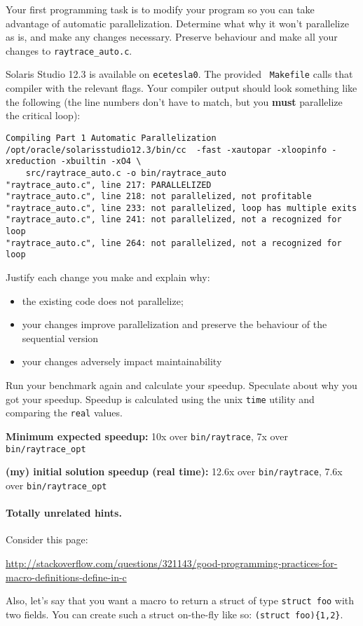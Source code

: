 \documentclass[letterpaper,10pt]{article}
\begin{document}
Your first programming task is to modify your program so you can take
advantage of automatic parallelization. Determine what why it won't
parallelize as is, and make any changes necessary. Preserve behaviour
and make all your changes to {\tt raytrace\_auto.c}.

Solaris Studio 12.3 is available on {\tt ecetesla0}. The provided {\tt
  Makefile} calls that compiler with the relevant flags. Your compiler
output should look something like the following (the line numbers
don't have to match, but you {\bf must} parallelize the critical loop):

\newpage
\begin{lstlisting}
Compiling Part 1 Automatic Parallelization
/opt/oracle/solarisstudio12.3/bin/cc  -fast -xautopar -xloopinfo -xreduction -xbuiltin -xO4 \
    src/raytrace_auto.c -o bin/raytrace_auto
"raytrace_auto.c", line 217: PARALLELIZED
"raytrace_auto.c", line 218: not parallelized, not profitable
"raytrace_auto.c", line 233: not parallelized, loop has multiple exits
"raytrace_auto.c", line 241: not parallelized, not a recognized for loop
"raytrace_auto.c", line 264: not parallelized, not a recognized for loop
\end{lstlisting}

Justify each change you make and explain why:
\begin{itemize}
\item the existing code does not parallelize;
\item your changes improve parallelization and preserve the behaviour of the sequential version
\item your changes adversely impact maintainability
\end{itemize}

Run your benchmark again and calculate your speedup. Speculate about why you got your speedup. Speedup is calculated using the unix \texttt{time} utility and comparing the \texttt{real} values. 

\squishlist
  \item {\bf Minimum expected speedup:} 10x over \texttt{bin/raytrace}, 7x over \texttt{bin/raytrace\_opt}
  \item {\bf (my) initial solution speedup (real time):} 12.6x over \texttt{bin/raytrace}, 7.6x over \texttt{bin/raytrace\_opt}
\squishend

\paragraph{Totally unrelated hints.} Consider this page:
\begin{center}
  \scriptsize \url{http://stackoverflow.com/questions/321143/good-programming-practices-for-macro-definitions-define-in-c}
\end{center}
Also, let's say that you want a macro to return a struct of type {\tt struct foo} with
two fields. You can create such a struct on-the-fly like so: \verb!(struct foo){1,2}!.
\end{document}
